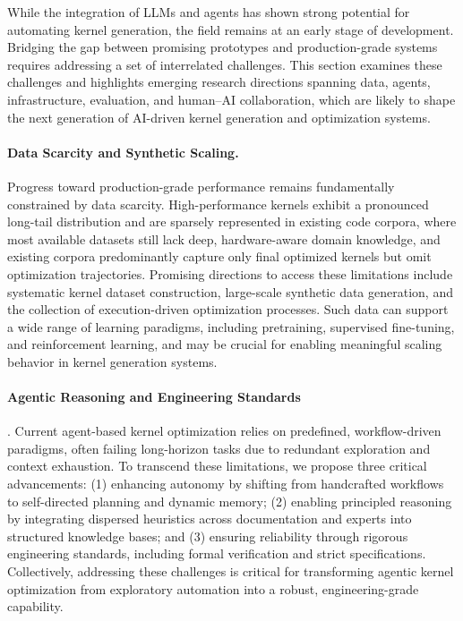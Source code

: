 While the integration of LLMs and agents has shown strong potential for automating kernel generation, the field remains at an early stage of development. Bridging the gap between promising prototypes and production-grade systems requires addressing a set of interrelated challenges. This section examines these challenges and highlights emerging research directions spanning data, agents, infrastructure, evaluation, and human–AI collaboration, which are likely to shape the next generation of AI-driven kernel generation and optimization systems.



\paragraph{Data Scarcity and Synthetic Scaling.} Progress toward production-grade performance remains fundamentally constrained by data scarcity. High-performance kernels exhibit a pronounced long-tail distribution and are sparsely represented in existing code corpora, where most available datasets still lack deep, hardware-aware domain knowledge, and existing corpora predominantly capture only final optimized kernels but omit optimization trajectories. Promising directions to access these limitations include systematic kernel dataset construction, large-scale synthetic data generation, and the collection of execution-driven optimization processes. Such data can support a wide range of learning paradigms, including pretraining, supervised fine-tuning, and reinforcement learning, and may be crucial for enabling meaningful scaling behavior in kernel generation systems.


\paragraph{Agentic Reasoning and Engineering Standards}. Current agent-based kernel optimization relies on predefined, workflow-driven paradigms, often failing long-horizon tasks due to redundant exploration and context exhaustion. To transcend these limitations, we propose three critical advancements: (1) enhancing autonomy by shifting from handcrafted workflows to self-directed planning and dynamic memory; (2) enabling principled reasoning by integrating dispersed heuristics across documentation and experts into structured knowledge bases; and (3) ensuring reliability through rigorous engineering standards, including formal verification and strict specifications. Collectively, addressing these challenges is critical for transforming agentic kernel optimization from exploratory automation into a robust, engineering-grade capability.


